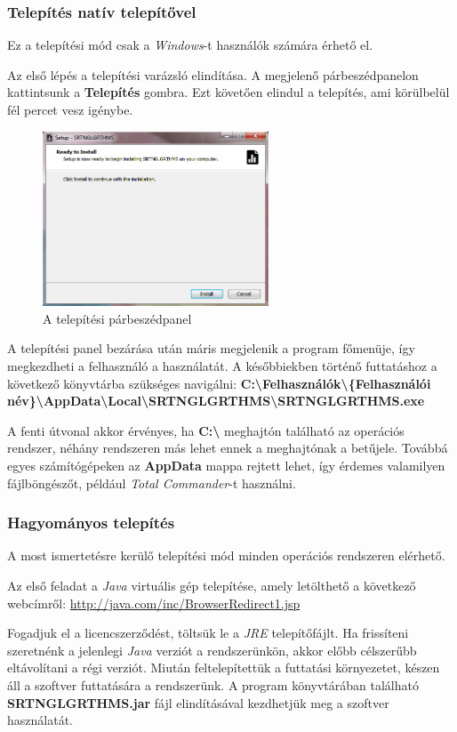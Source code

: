 \documentclass{elteikthesis}
\begin{document}
\subsubsection{Telepítés natív telepítővel}
Ez a telepítési mód csak a \emph{Windows}-t használók számára érhető el.\par
Az első lépés a telepítési varázsló elindítása. A megjelenő párbeszédpanelon kattintsunk a \textbf{Telepítés} gombra. Ezt követően elindul a telepítés, ami körülbelül fél percet vesz igénybe.\par
\begin{figure}[H]
	\centering
	\includegraphics[width=0.6\textwidth]{pics/setup.png}
	\caption{A telepítési párbeszédpanel}
\end{figure}\par
A telepítési panel bezárása után máris megjelenik a program főmenüje, így megkezdheti a felhasználó a használatát. A későbbiekben történő futtatáshoz a következő könyvtárba szükséges navigálni: \textbf{C:\textbackslash Felhasználók\textbackslash \{Felhasználói név\}\textbackslash AppData\textbackslash Local\textbackslash SRTNGLGRTHMS\textbackslash SRTNGLGRTHMS.exe} \par
A fenti útvonal akkor érvényes, ha \textbf{C:\textbackslash} meghajtón található az operációs rendszer, néhány rendszeren más lehet ennek a meghajtónak a betűjele. Továbbá egyes számítógépeken az \textbf{AppData} mappa rejtett lehet, így érdemes valamilyen fájlböngészőt, például \emph{Total Commander}-t használni.

\subsubsection{Hagyományos telepítés}
A most ismertetésre kerülő telepítési mód minden operációs rendszeren elérhető.\par
Az első feladat a \emph{Java} virtuális gép telepítése, amely letölthető a következő webcímről: \url{http://java.com/inc/BrowserRedirect1.jsp}\par
Fogadjuk el a licencszerződést, töltsük le a \emph{JRE} telepítőfájlt. Ha frissíteni szeretnénk a jelenlegi \emph{Java} verziót a rendszerünkön, akkor előbb célszerűbb eltávolítani a régi verziót. Miután feltelepítettük a futtatási környezetet,  készen áll a szoftver futtatására a rendszerünk. A program könyvtárában található \textbf{SRTNGLGRTHMS.jar} fájl elindításával kezdhetjük meg a szoftver használatát.
\end{document}
